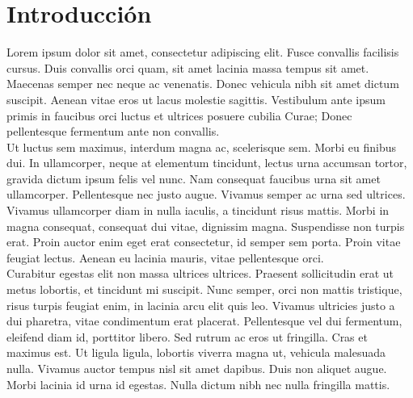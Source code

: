 





\chapter{Introducción}



Lorem ipsum dolor sit amet, consectetur adipiscing elit. Fusce convallis facilisis cursus. Duis convallis orci quam, sit amet lacinia massa tempus sit amet. Maecenas semper nec neque ac venenatis. Donec vehicula nibh sit amet dictum suscipit. Aenean vitae eros ut lacus molestie sagittis. Vestibulum ante ipsum primis in faucibus orci luctus et ultrices posuere cubilia Curae; Donec pellentesque fermentum ante non convallis.
\\

Ut luctus sem maximus, interdum magna ac, scelerisque sem. Morbi eu finibus dui. In ullamcorper, neque at elementum tincidunt, lectus urna accumsan tortor, gravida dictum ipsum felis vel nunc. Nam consequat faucibus urna sit amet ullamcorper. Pellentesque nec justo augue. Vivamus semper ac urna sed ultrices. Vivamus ullamcorper diam in nulla iaculis, a tincidunt risus mattis. Morbi in magna consequat, consequat dui vitae, dignissim magna. Suspendisse non turpis erat. Proin auctor enim eget erat consectetur, id semper sem porta. Proin vitae feugiat lectus. Aenean eu lacinia mauris, vitae pellentesque orci.
\\

Curabitur egestas elit non massa ultrices ultrices. Praesent sollicitudin erat ut metus lobortis, et tincidunt mi suscipit. Nunc semper, orci non mattis tristique, risus turpis feugiat enim, in lacinia arcu elit quis leo. Vivamus ultricies justo a dui pharetra, vitae condimentum erat placerat. Pellentesque vel dui fermentum, eleifend diam id, porttitor libero. Sed rutrum ac eros ut fringilla. Cras et maximus est. Ut ligula ligula, lobortis viverra magna ut, vehicula malesuada nulla. Vivamus auctor tempus nisl sit amet dapibus. Duis non aliquet augue. Morbi lacinia id urna id egestas. Nulla dictum nibh nec nulla fringilla mattis.
\\

